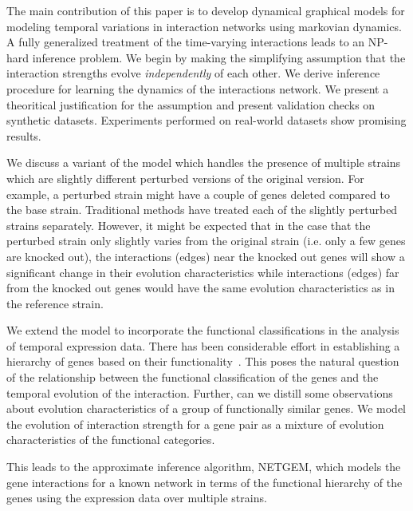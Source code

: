 \documentclass{bioinfo}
\begin{document}
The main contribution of this paper is to develop dynamical graphical
models for  modeling
temporal variations in interaction networks using markovian
dynamics. A fully generalized treatment of the time-varying interactions leads to an NP-hard
inference problem. We begin by making the simplifying assumption that
the interaction strengths evolve \emph{independently} of each other. We derive
inference procedure for learning the dynamics of the interactions
network.  We present a theoritical justification for the assumption
and present validation checks on synthetic datasets. Experiments
performed on real-world datasets show promising results.  

We discuss a variant of the model which handles the presence of multiple
strains which are slightly different perturbed versions of the
original version. For example, a perturbed strain might have a couple
of genes deleted compared to the base strain. Traditional methods have treated each of the
slightly perturbed strains separately. However, it might be expected
that in the case that the perturbed strain only slightly varies from
the original strain (i.e. only a few genes are knocked out), the
interactions (edges) near the knocked out genes will show a
significant change in their evolution characteristics 
while interactions (edges) far from the knocked out genes would have
the same evolution characteristics as in the reference strain. 

 We extend the model to incorporate the
functional classifications in the analysis of temporal expression data.
There has been considerable effort in establishing a 
hierarchy of genes based on their 
functionality~\citep{Bader:2003:Nucleic-Acids-Res:12519993, MIPS,
  citeulike:814974, citeulike:226627, citeulike:3733950}. This poses 
the natural question of the relationship between the functional classification of
the genes and the temporal evolution of the interaction. Further, can
we distill some observations about evolution characteristics of a
group of functionally similar genes.  We
  model the evolution of interaction strength for a gene pair as a
  mixture of evolution characteristics of the functional
  categories. 



This leads to the approximate inference algorithm, NETGEM, which models the gene
  interactions for a known network in terms of the functional
  hierarchy of the genes using the expression data over multiple
  strains. 
\end{document}
